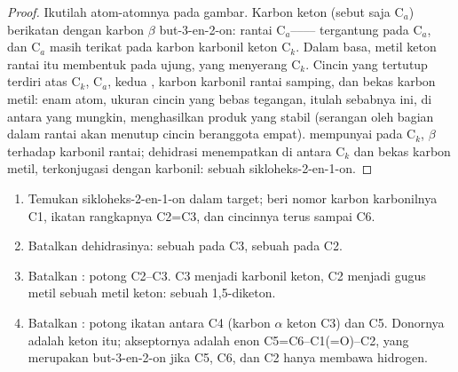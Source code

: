\begin{proof}
Ikutilah atom-atomnya pada gambar. Karbon  keton (sebut saja
C$_a$) berikatan dengan karbon $\beta$
but-3-en-2-on: rantai C$_a$-------- tergantung pada C$_a$, dan
C$_a$ masih terikat pada karbon karbonil keton C$_k$. Dalam basa, metil
keton rantai itu membentuk  pada  ujung, yang menyerang
C$_k$. Cincin yang tertutup terdiri atas C$_k$, C$_a$,
kedua , karbon karbonil rantai samping, dan bekas karbon metil:
enam atom, ukuran cincin yang bebas tegangan, itulah sebabnya  ini, di
antara  yang mungkin, menghasilkan produk yang stabil (serangan
oleh   bagian dalam rantai akan menutup cincin beranggota
empat).  mempunyai
 pada C$_k$, $\beta$ terhadap karbonil rantai; dehidrasi menempatkan
 di antara C$_k$ dan bekas karbon metil, terkonjugasi dengan
karbonil: sebuah sikloheks-2-en-1-on.
\end{proof}

\begin{method}\label{met:b2:conjugate-additions:robinson-disconnection}
\begin{enumerate}
  \item Temukan sikloheks-2-en-1-on dalam target; beri nomor karbon
        karbonilnya C1, ikatan rangkapnya C2=C3, dan cincinnya terus sampai C6.
  \item Batalkan dehidrasinya: sebuah  pada C3, sebuah  pada C2.
  \item Batalkan : potong C2--C3. C3 menjadi karbonil keton, C2
        menjadi gugus metil sebuah metil keton: sebuah 1,5-diketon.
  \item Batalkan : potong ikatan antara C4 (karbon
        $\alpha$ keton C3) dan C5. Donornya adalah keton itu; akseptornya
        adalah enon C5=C6--C1(=O)--C2, yang merupakan but-3-en-2-on jika C5,
        C6, dan C2 hanya membawa hidrogen.
\end{enumerate}
\end{method}


